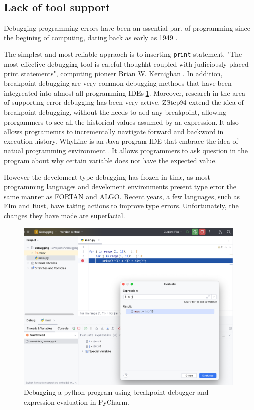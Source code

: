 \subsection{Lack of tool support}
Debugging programming errors have been an essential part of programming since the begining of computing, dating back as early as 1949 \cite{Campbell-Kelly1992-rn}. 

The simplest and most reliable appraoch is to inserting \texttt{print} statement. "The most effective debugging tool is careful thoughht coupled with judiciously placed print statements", computing pioneer Brian W. Kernighan \cite{Kernighan1978-xs}.  In addition, breakpoint debugging are very common debugging methods that have been integreated into almost all programming IDEs \ref{fig:breakpoint}. Moreover, research in the area of supporting error debugging has been very active. ZStep94 \cite{Lieberman1995-lg} extend the idea of breakpoint debugging, without the needs to add any breakpoint, allowing prorgammers to see all the historical values assumed by an expression. It also allows programemrs to incrementally navtigate forward and backword in execution history. WhyLine \cite{Ko2009-uf} is an Java program IDE that embrace the idea of natual programming environment \cite{Myers2004-fy}. It allows programmers to ask question in the program about why certain variable does not have the expected value. 

However the develoment type debugging has frozen in time, as most programming languages and develoment environments present type error the same manner as FORTAN and ALGO. Recent years, a few languages, such as Elm and Rust, have taking actions to improve type errors. Unfortunately, the changes they have made are superfacial.

\begin{figure}[hbt]
  \includegraphics[width=\linewidth]{BreakPoint}
  \caption{
    \label{fig:breakpoint}
    Debugging a python program using breakpoint debugger and expression evaluation in PyCharm.
    }
\end{figure}

